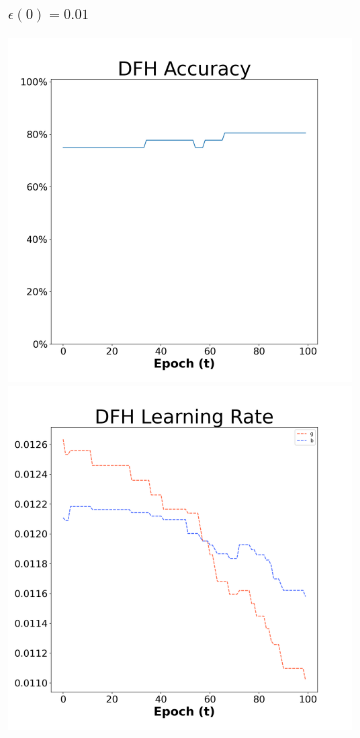 \begin{figure}[H]
\begin{subfigure}{0.3\textwidth}
  \caption{$\epsilon(0)=0.01$}
\end{subfigure}\hfil %
\begin{subfigure}{0.3\textwidth}
  \includegraphics[width=\linewidth]{images/exper1/Ionosphere/DFH_0.03_acc.png}
  \includegraphics[width=\linewidth]{images/exper1/Ionosphere/DFH_0.03_lr.png}

\end{subfigure}
\end{figure}
